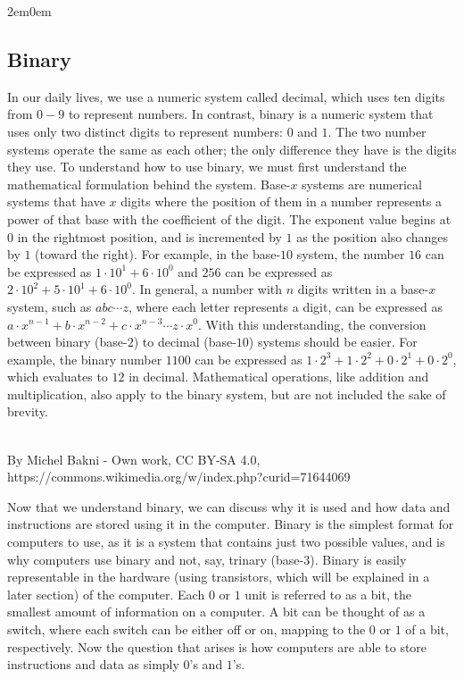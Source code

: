 \documentclass[openany, 12px]{book}
\begin{document}
\begin{adjustwidth}{2em}{0em}
\subsection{Binary}
In our daily lives, we use a numeric system called decimal, which uses ten digits from $0-9$ to represent numbers. In contrast, binary is a numeric system that uses only two distinct digits to represent numbers: $0$ and $1$. The two number systems operate the same as each other; the only difference they have is the digits they use. To understand how to use binary, we must first understand the mathematical formulation behind the system. Base-$x$ systems are numerical systems that have $x$ digits where the position of them in a number represents a power of that base with the coefficient of the digit. The exponent value begins at $0$ in the rightmost position, and is incremented by $1$ as the position also changes by $1$ (toward the right). For example, in the base-$10$ system, the number $16$ can be expressed as $1 \cdot 10^1 + 6 \cdot 10^0$ and $256$ can be expressed as $2 \cdot 10^2 + 5 \cdot 10^1 + 6 \cdot 10^0$. In general, a number with $n$ digits written in a base-$x$ system, such as $abc \cdots z$, where each letter represents a digit, can be expressed as $a \cdot x^{n-1} + b \cdot x^{n-2} + c \cdot x^{n-3} \cdots z \cdot x^{0}$. With this understanding, the conversion between binary (base-$2$) to decimal (base-$10$) systems should be easier. For example, the binary number $1100$ can be expressed as $1 \cdot 2^{3} + 1 \cdot 2^{2} + 0 \cdot 2^{1} + 0 \cdot 2^{0}$, which evaluates to $12$ in decimal. Mathematical operations, like addition and multiplication, also apply to the binary system, but are not included the sake of brevity. \\\\
\end{adjustwidth}

By Michel Bakni - Own work, CC BY-SA 4.0, https://commons.wikimedia.org/w/index.php?curid=71644069

Now that we understand binary, we can discuss why it is used and how data and instructions are stored using it in the computer. Binary is the simplest format for computers to use, as it is a system that contains just two possible values, and is why computers use binary and not, say, trinary (base-$3$). Binary is easily representable in the hardware (using transistors, which will be explained in a later section) of the computer. Each $0$ or $1$ unit is referred to as a bit, the smallest amount of information on a computer. A bit can be thought of as a switch, where each switch can be either off or on, mapping to the $0$ or $1$ of a bit, respectively. Now the question that arises is how computers are able to store instructions and data as simply $0$'s and $1$'s.
\end{document}

